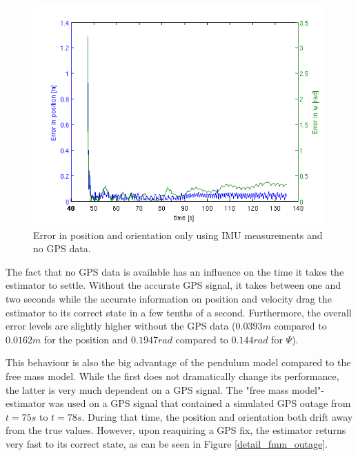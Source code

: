 \begin{figure}[h]
\centering
\includegraphics[width=1\textwidth]{pictures/2_2_errors_noGPS.png}
\caption{Error in position and orientation only using IMU measurements and no GPS data.}
\label{error_noGPS}
\end{figure}
The fact that no GPS data is available has an influence on the time it takes the estimator to settle. Without the accurate GPS signal, it takes between one and two seconds while the accurate information on position and velocity drag the estimator to its correct state in a few tenths of a second. Furthermore, the overall error levels are slightly higher without the GPS data ($0.0393 m$ compared to $0.0162 m$ for the position and $0.1947 rad$ compared to $0.144 rad$ for $\Psi$). 

This behaviour is also the big advantage of the pendulum model compared to the free mass model. While the first does not dramatically change its performance, the latter is very much dependent on a GPS signal. The "free mass model"-estimator was used on a GPS signal that contained a simulated GPS outage from $t=75 s$ to $t=78 s$. During that time, the position and orientation both drift away from the true values. However, upon reaquiring a GPS fix, the estimator returns very fast to its correct state, as can be seen in Figure \ref{detail_fmm_outage}.

